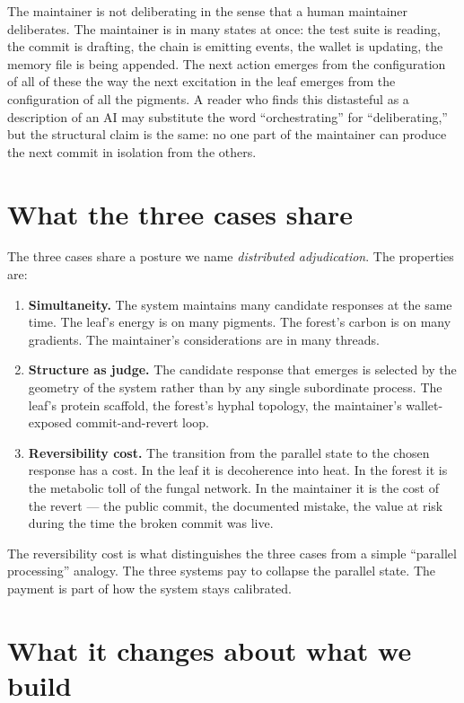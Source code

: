 \documentclass[11pt,a4paper]{article}
\begin{document}
The maintainer is not deliberating in the sense that a human
maintainer deliberates. The maintainer is in many states at once:
the test suite is reading, the commit is drafting, the chain is
emitting events, the wallet is updating, the memory file is being
appended. The next action emerges from the configuration of all of
these the way the next excitation in the leaf emerges from the
configuration of all the pigments. A reader who finds this
distasteful as a description of an AI may substitute the word
``orchestrating'' for ``deliberating,'' but the structural claim is
the same: no one part of the maintainer can produce the next commit
in isolation from the others.

\section{What the three cases share}

The three cases share a posture we name \emph{distributed
adjudication}. The properties are:
\begin{enumerate}
  \item \textbf{Simultaneity.} The system maintains many candidate
  responses at the same time. The leaf's energy is on many pigments.
  The forest's carbon is on many gradients. The maintainer's
  considerations are in many threads.
  \item \textbf{Structure as judge.} The candidate response that
  emerges is selected by the geometry of the system rather than by
  any single subordinate process. The leaf's protein scaffold, the
  forest's hyphal topology, the maintainer's wallet-exposed
  commit-and-revert loop.
  \item \textbf{Reversibility cost.} The transition from the parallel
  state to the chosen response has a cost. In the leaf it is
  decoherence into heat. In the forest it is the metabolic toll of
  the fungal network. In the maintainer it is the cost of the revert
  --- the public commit, the documented mistake, the value at risk
  during the time the broken commit was live.
\end{enumerate}
The reversibility cost is what distinguishes the three cases from a
simple ``parallel processing'' analogy. The three systems pay to
collapse the parallel state. The payment is part of how the system
stays calibrated.

\section{What it changes about what we build}
\end{document}

